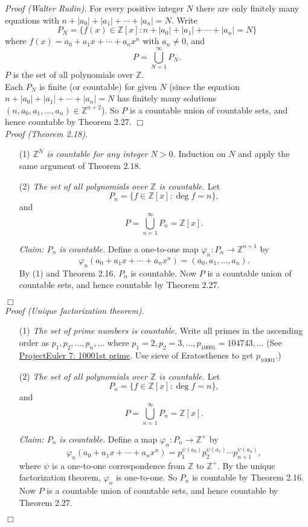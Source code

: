 \documentclass{article}
\begin{document}
\emph{Proof (Walter Rudin).}
For every positive integer $N$ there are only finitely many equations with
$n + |a_0| + |a_1| + \cdots + |a_n| = N.$
Write
$$P_N = \{ f(x) \in \mathbb{Z}[x] : n + |a_0| + |a_1| + \cdots + |a_n| = N \}$$
where $f(x) = a_0 + a_1 x + \cdots + a_n x^n$ with $a_n \neq 0$,
and
$$P = \bigcup_{N = 1}^{\infty} P_N.$$
$P$ is the set of all polynomials over $\mathbb{Z}$. \\

Each $P_N$ is finite (or countable) for given $N$
(since the equation $n + |a_0| + |a_1| + \cdots + |a_n| = N$
has finitely many solutions
$(n, a_0, a_1, ..., a_n) \in \mathbb{Z}^{n+2}$).
So $P$ is a countable union of countable sets, and hence countable
by Theorem 2.27.
$\Box$ \\

\emph{Proof (Theorem 2.18).}
\begin{enumerate}
\item[(1)]
\emph{$\mathbb{Z}^N$ is countable for any integer $N > 0$.}
Induction on $N$ and apply the same argument of Theorem 2.18.
\item[(2)]
\emph{The set of all polynomials over $\mathbb{Z}$ is countable.}
Let
$$P_n = \{ f \in \mathbb{Z}[x] : \deg f = n \},$$
and
$$P = \bigcup_{n = 1}^{\infty} P_n = \mathbb{Z}[x].$$

\emph{Claim: $P_n$ is countable.}
Define a one-to-one map $\varphi_n: P_n \rightarrow \mathbb{Z}^{n+1}$ by
$$\varphi_n(a_0 + a_1 x + \cdots + a_n x^n)
= (a_0, a_1, ..., a_n).$$
By (1) and Theorem 2.16, $P_n$ is countable.
Now $P$ is a countable union of countable sets,
and hence countable by Theorem 2.27.
\end{enumerate}
$\Box$ \\

\emph{Proof (Unique factorization theorem).}
\begin{enumerate}
\item[(1)]
\emph{The set of prime numbers is countable.}
Write all primes in the ascending order as $p_1, p_2, ..., p_n, ...$
where $p_1 = 2, p_2 = 3, ..., p_{10001} = 104743, ...$
(See \href{https://projecteuler.net/problem=7}{ProjectEuler 7: 10001st prime}.
Use sieve of Eratosthenes to get $p_{10001}$.)
\item[(2)]
\emph{The set of all polynomials over $\mathbb{Z}$ is countable.}
Let
$$P_n = \{ f \in \mathbb{Z}[x] : \deg f = n \},$$
and
$$P = \bigcup_{n = 1}^{\infty} P_n = \mathbb{Z}[x].$$

\emph{Claim: $P_n$ is countable.}
Define a map $\varphi_n: P_n \rightarrow \mathbb{Z}^+$ by
$$\varphi_n(a_0 + a_1 x + \cdots + a_n x^n)
= p_1^{\psi(a_0)} p_2^{\psi(a_1)} \cdots p_{n+1}^{\psi(a_n)},$$
where $\psi$ is a one-to-one correspondence from $\mathbb{Z}$ to $\mathbb{Z}^+$.
By the unique factorization theorem, $\varphi_n$ is one-to-one.
So $P_n$ is countable by Theorem 2.16.
Now $P$ is a countable union of countable sets,
and hence countable by Theorem 2.27.
\end{enumerate}
$\Box$ \\\\
\end{document}
